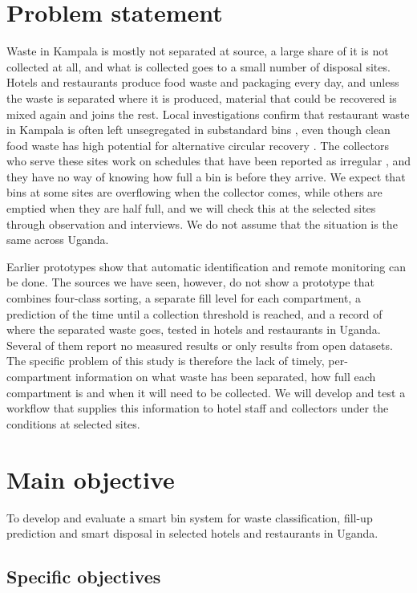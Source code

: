 \section{Problem statement}

Waste in Kampala is mostly not separated at source, a large share of it is not collected at all, and what is collected goes to a small number of disposal sites. Hotels and restaurants produce food waste and packaging every day, and unless the waste is separated where it is produced, material that could be recovered is mixed again and joins the rest. Local investigations confirm that restaurant waste in Kampala is often left unsegregated in substandard bins \cite{walina}, even though clean food waste has high potential for alternative circular recovery \cite{ssepuuya}. The collectors who serve these sites work on schedules that have been reported as irregular \cite{mwesigwa}, and they have no way of knowing how full a bin is before they arrive. We expect that bins at some sites are overflowing when the collector comes, while others are emptied when they are half full, and we will check this at the selected sites through observation and interviews. We do not assume that the situation is the same across Uganda.

Earlier prototypes show that automatic identification and remote monitoring can be done. The sources we have seen, however, do not show a prototype that combines four-class sorting, a separate fill level for each compartment, a prediction of the time until a collection threshold is reached, and a record of where the separated waste goes, tested in hotels and restaurants in Uganda. Several of them report no measured results or only results from open datasets. The specific problem of this study is therefore the lack of timely, per-compartment information on what waste has been separated, how full each compartment is and when it will need to be collected. We will develop and test a workflow that supplies this information to hotel staff and collectors under the conditions at selected sites.

\section{Main objective}

To develop and evaluate a smart bin system for waste classification, fill-up prediction and smart disposal in selected hotels and restaurants in Uganda.

\subsection{Specific objectives}

